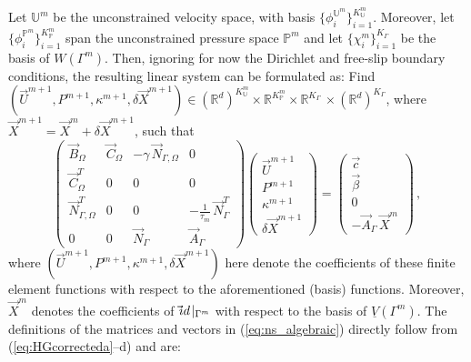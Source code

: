 \documentclass[a4paper,12pt,onecolumn]{article}
\newcommand{\R}{\mathbb R}
\newcommand{\Vh}{\underline{V}(\Gamma^m)}
\newcommand{\Wh}{W(\Gamma^m)}
\newcommand{\uspacesimple}{\mathbb{U}}
\newcommand{\pspace}{\mathbb{P}}
\newcommand{\id}{\rm id}
\newcommand{\NbulkT}{\vec{N}_{\Gamma,\Omega}^T}
\newcommand{\Nbulk}{\vec{N}_{\Gamma,\Omega}}
\begin{document}
Let $\uspacesimple^m$ be the unconstrained velocity space, with basis
$\{\phi_i^{\uspacesimple^m}\}_{i=1}^{K^m_\uspacesimple}$. Moreover, let
$\{\phi_i^{\pspace^m}\}_{i=1}^{K^m_\pspace}$ span the unconstrained pressure
space $\pspace^m$ and let $\{\chi_i^m\}_{i=1}^{K_\Gamma}$ be the basis of
$\Wh$. Then, ignoring for now the Dirichlet and free-slip boundary conditions,
the resulting linear system can be formulated as: Find $(\vec U^{m+1},P^{m+1},
\kappa^{m+1},\delta\vec X^{m+1})\in (\R^d)^{K^m_\uspacesimple}\times
\R^{K^m_\pspace} \times \R^{K_\Gamma}\,\times (\R^d)^{K_\Gamma}$, where $\vec
X^{m+1} = \vec X^m+ \delta\vec X^{m+1}$, such that
\begin{equation}
\begin{pmatrix}
\vec B_\Omega & \vec C_\Omega & -\gamma\,\Nbulk & 0 \\
\vec C^T_\Omega & 0 & 0 & 0 \\
\NbulkT & 0 & 0 & -\frac1{\tau_m}\,\vec N_\Gamma^T \\
0 & 0 & \vec N_\Gamma & \vec A_\Gamma
\end{pmatrix}
\begin{pmatrix}
\vec U^{m+1} \\
P^{m+1} \\
\kappa^{m+1} \\
\delta\vec X^{m+1}
\end{pmatrix}
=
\begin{pmatrix}
\vec c \\
\vec \beta \\
0 \\
-\vec A_\Gamma\,\vec X^m
\end{pmatrix} \,,
\label{eq:ns_algebraic}
\end{equation}
where $(\vec U^{m+1},P^{m+1},\kappa^{m+1},\delta\vec X^{m+1})$ here denote the
coefficients of these finite element functions with respect to the
aforementioned (basis) functions.
Moreover, $\vec X^m$ denotes the coefficients of
$\vec\id\!\mid_{\Gamma^m}$ with respect to the basis of $\Vh$. The definitions
of the matrices and vectors in (\ref{eq:ns_algebraic}) directly follow from
(\ref{eq:HGcorrecteda}--d) and are:
\end{document}
